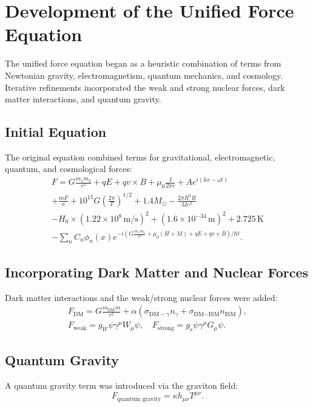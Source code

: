 \documentclass[12pt, a4paper]{article}
\begin{document}
\section{Development of the Unified Force Equation}
The unified force equation began as a heuristic combination of terms from Newtonian gravity, electromagnetism, quantum mechanics, and cosmology. Iterative refinements incorporated the weak and strong nuclear forces, dark matter interactions, and quantum gravity.

\subsection{Initial Equation}
The original equation combined terms for gravitational, electromagnetic, quantum, and cosmological forces:
\begin{multline*}
F = G\frac{m_1 m_2}{r^2} + qE + qv \times B + \mu_0 \frac{I}{2\pi r} + A e^{i(kx - \omega t)} \\
+ \frac{mF}{a} + 10^{15} G \left(\frac{2\pi}{T}\right)^{1/2} + 1.4 M_{\odot} - \frac{2\pi R^2 B}{3 I c^2} \\
- H_0 \times (1.22 \times 10^8 \, \text{m/s})^2 + (1.6 \times 10^{-34} \, \text{m})^2 + 2.725 \, \text{K} \\
- \sum_{n} C_n \phi_n(x) e^{-i\left(G\frac{m_1 m_2}{r^2} + \mu_0 (H + M) + qE + qv \times B\right)/\hbar t}.
\end{multline*}

\subsection{Incorporating Dark Matter and Nuclear Forces}
Dark matter interactions and the weak/strong nuclear forces were added:
\begin{multline*}
F_{\text{DM}} = G \frac{m_{\text{DM}} m}{r^2} + \alpha \left( \sigma_{\text{DM}-\gamma} n_{\gamma} + \sigma_{\text{DM}-\text{ISM}} n_{\text{ISM}} \right), \\
F_{\text{weak}} = g_W \psi \gamma^\mu W_\mu \psi, \quad F_{\text{strong}} = g_s \psi \gamma^\mu G_\mu \psi.
\end{multline*}

\subsection{Quantum Gravity}
A quantum gravity term was introduced via the graviton field:
\[
F_{\text{quantum gravity}} = \kappa h_{\mu\nu} T^{\mu\nu}.
\]
\end{document}
